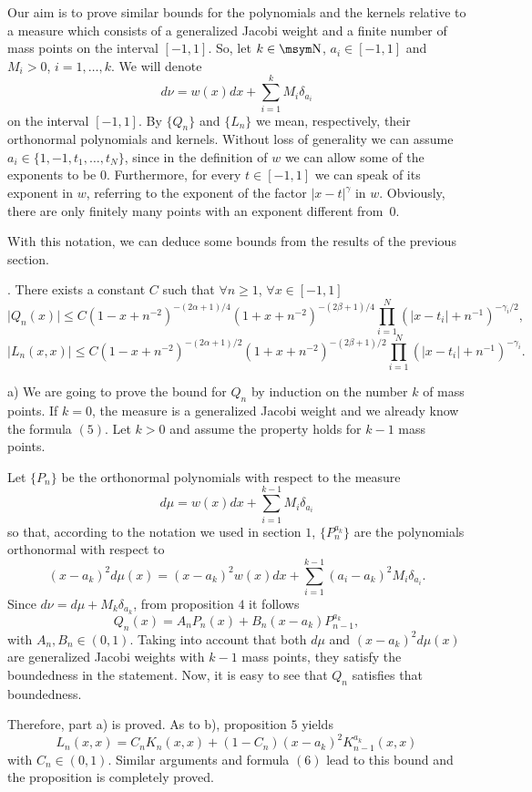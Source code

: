 Our aim is to prove similar bounds for the polynomials and the kernels relative
to a measure which consists of a generalized Jacobi weight and a finite number
of mass points on the interval $[-1,1]$. So, let $k \in \N$, $a_i \in [-1,1]$ and
$M_i > 0$, $i=1,\dots,k$. We will denote
$$
   d\nu = w(x)dx + \sum_{i=1}^k M_i\delta_{a_i}
$$
on the interval $[-1,1]$. By $\{Q_n\}$ and $\{L_n\}$ we mean, respectively,
their orthonormal polynomials and kernels. Without loss of generality we can
assume $a_i \in \{1,-1,t_1,\dots,t_N\}$, since in the definition of $w$ we can
allow some of the exponents to be $0$. Furthermore, for every $t \in [-1,1]$ we
can speak of its exponent in $w$, referring to the exponent of the factor
$\vert x-t \vert ^\gamma$ in $w$. Obviously, there are only finitely many points
with an exponent different from~$0$.

With this notation, we can deduce some bounds from the results of the previous
section.

. There exists a constant $C$ such that $\forall n \geq
1$, $\forall x \in [-1,1]$
$$
   \vert Q_n(x) \vert \leq C (1-x+n^{-2})^{-(2\alpha+1)/4}
   (1+x+n^{-2})^{-(2\beta+1)/4} 
   \prod_{i=1}^N (\vert x-t_i \vert+n^{-1})^{-\gamma_i/2},
$$
$$
   \vert L_n(x,x) \vert \leq C (1-x+n^{-2})^{-(2\alpha+1)/2}
   (1+x+n^{-2})^{-(2\beta+1)/2} 
   \prod_{i=1}^N (\vert x-t_i \vert+n^{-1})^{-\gamma_i}.
$$

\proof a) We are going to prove the bound for $Q_n$ by induction on the number
$k$ of mass points. If $k=0$, the measure is a generalized Jacobi weight and we
already know the formula $(5)$. Let $k>0$ and assume the property holds for
$k-1$ mass points.

Let $\{P_n\}$ be the orthonormal polynomials with respect to the measure
$$
   d\mu = w(x)dx + \sum_{i=1}^{k-1} M_i\delta_{a_i}
$$
so that, according to the notation we used in section $1$, $\{P_n^{a_k}\}$ are
the polynomials orthonormal with respect to
$$
   (x-a_k)^2d\mu(x) = (x-a_k)^2w(x)dx
   + \sum_{i=1}^{k-1} (a_i-a_k)^2 M_i\delta_{a_i}.
$$
Since $d\nu = d\mu + M_k\delta_{a_k}$, from proposition $4$ it follows
$$
   Q_n(x) = A_n P_n(x) + B_n (x-a_k) P_{n-1}^{a_k},
$$
with $A_n, B_n \in (0,1)$. Taking into account that both $d\mu$ and
$(x-a_k)^2d\mu(x)$ are generalized Jacobi weights with $k-1$ mass points, they
satisfy the boundedness in the statement. Now, it is easy to see that $Q_n$
satisfies that boundedness.

Therefore, part a) is proved. As to b), proposition $5$ yields
$$
   L_n(x,x) = C_n K_n(x,x) + (1-C_n) (x-a_k)^2 K_{n-1}^{a_k}(x,x)
$$
with $C_n \in (0,1)$. Similar arguments and formula $(6)$ lead to this bound
and the proposition is completely proved.

